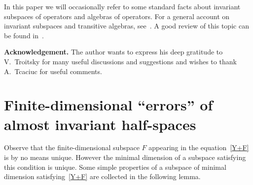 \documentclass[12pt]{amsart}
\theoremstyle{plain}
\theoremstyle{definition}
\theoremstyle{remark}
\begin{document}
In this paper we will occasionally refer to some standard facts about invariant subspaces of operators and algebras of operators. For a general account on invariant subspaces and transitive algebras, see~\cite{RR03}. A good review of this topic can be found in~\cite{AA02}.

{\bf Acknowledgement.} The author wants to express his deep gratitude to V.~Troitsky for many useful discussions and suggestions and wishes to thank A.~Tcaciuc for useful comments.

\section{Finite-dimensional ``errors'' of almost invariant half-spaces}\label{errors-study}

Observe that the finite-dimensional subspace $F$ appearing in the equation~\eqref{Y+F} is by no means unique. However the minimal dimension of a subspace satisfying this condition is unique. Some simple properties of a subspace of minimal dimension satisfying~\eqref{Y+F} are collected in the following lemma.
\end{document}
